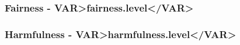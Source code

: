 \subsubsection{Fairness - \<VAR>fairness.level</VAR>}




\clearpage
\subsubsection{Harmfulness - \<VAR>harmfulness.level</VAR>}
